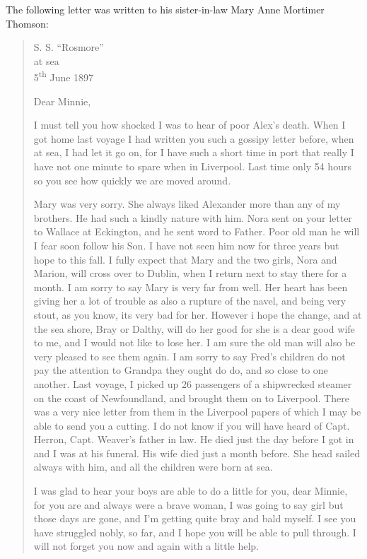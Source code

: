 The following letter was written to his sister-in-law Mary Anne Mortimer Thomson:\cite{SMWCletter}
\begin{quotation}
\begin{flushright}
S. S. ``Rosmore'' \\
at sea \\
5\textsuperscript{th} June 1897
\end{flushright}

Dear Minnie,

I must tell you how shocked I was to hear of poor Alex's death. When I got home last voyage I had written you such a gossipy letter before, when at sea, I had let it go on, for I have such a short time in port that really I have not one minute to spare when in Liverpool. Last time only 54 hours so you see how quickly we are moved around.

Mary was very sorry. She always liked Alexander more than any of my brothers. He had such a kindly nature with him. Nora sent on your letter to Wallace at Eckington, and he sent word to Father. Poor old man he will I fear soon follow his Son. I have not seen him now for three years but hope to this fall. I fully expect that Mary and the two girls, Nora and Marion, will cross over to Dublin, when I return next to stay there for a month. I am sorry to say Mary is very far from well. Her heart has been giving her a lot of trouble as also a rupture of the navel, and being very stout, as you know, its very bad for her. However i hope the change, and at the sea shore, Bray or Dalthy, will do her good for she is a dear good wife to me, and I would not like to lose her. I am sure the old man will also be very pleased to see them again. I am sorry to say Fred's children do not pay the attention to Grandpa they ought do do, and so close to one another. Last voyage, I picked up 26 passengers of a shipwrecked steamer on the coast of Newfoundland, and brought them on to Liverpool. There was a very nice letter from them in the Liverpool papers of which I may be able to send you a cutting. I do not know if you will have heard of Capt. Herron, Capt. Weaver's father in law. He died just the day before I got in and I was at his funeral. His wife died just a month before. She head sailed always with him, and all the children were born at sea.

I was glad to hear your boys are able to do a little for you, dear Minnie, for you are and always were a brave woman, I was going to say girl but those days are gone, and I'm getting quite bray and bald myself. I see you have struggled nobly, so far, and I hope you will be able to pull through. I will not forget you now and again with a little help.


\end{quotation}
